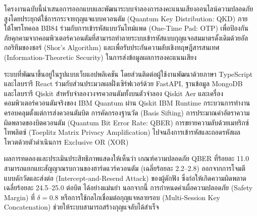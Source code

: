 \maketitle
\makesignature

\ifproject
\begin{abstractTH}
โครงงานฉบับนี้นำเสนอการออกแบบและพัฒนาระบบจำลองการลงคะแนนเสียงออนไลน์ความปลอดภัยสูงโดยประยุกต์ใช้การกระจายกุญแจแบบควอนตัม (Quantum Key Distribution: QKD) ภายใต้โพรโทคอล BB84 ร่วมกับการเข้ารหัสแบบวันไทม์แพด (One-Time Pad: OTP) เพื่อป้องกันภัยคุกคามจากคอมพิวเตอร์ควอนตัมที่สามารถทำลายระบบเข้ารหัสแบบกุญแจอสมมาตรดั้งเดิมด้วยอัลกอริทึมของชอร์ (Shor's Algorithm) และเพื่อรับประกันความลับเชิงทฤษฎีสารสนเทศ (Information-Theoretic Security) ในการส่งข้อมูลผลการลงคะแนนเสียง

\enskip ระบบที่พัฒนาขึ้นอยู่ในรูปแบบเว็บแอปพลิเคชัน โดยส่วนติดต่อผู้ใช้งานพัฒนาด้วยภาษา TypeScript และไลบรารี React ร่วมกับส่วนประมวลผลฝั่งเซิร์ฟเวอร์ด้วย FastAPI, ฐานข้อมูล MongoDB และไลบรารี Qiskit สำหรับจำลองวงจรควอนตัมทั้งบนตัวจำลอง Qiskit Aer และเครื่องคอมพิวเตอร์ควอนตัมจริงของ IBM Quantum ผ่าน Qiskit IBM Runtime กระบวนการทำงานครอบคลุมตั้งแต่การส่งควอนตัมบิต การคัดกรองฐานวัด (Basis Sifting) การประมาณค่าอัตราความผิดพลาดของบิตควอนตัม (Quantum Bit Error Rate: QBER) การขยายความลับด้วยเมทริกซ์โทพลิตซ์ (Toeplitz Matrix Privacy Amplification) ไปจนถึงการเข้ารหัสและถอดรหัสผลโหวตด้วยตัวดำเนินการ Exclusive OR (XOR)

\enskip ผลการทดลองและประเมินประสิทธิภาพแสดงให้เห็นว่า เกณฑ์ความปลอดภัย QBER ที่ร้อยละ 11.0 สามารถแยกแยะสัญญาณรบกวนของฮาร์ดแวร์ควอนตัม (เฉลี่ยร้อยละ 2.2--2.8) ออกจากการโจมตีแบบดักวัดและส่งต่อ (Intercept-and-Resend Attack) ของผู้ดักฟัง ซึ่งก่อให้เกิดความผิดพลาดเฉลี่ยร้อยละ 24.5--25.0 ต่อบิต ได้อย่างแม่นยำ นอกจากนี้ การกำหนดค่าเผื่อความปลอดภัย (Safety Margin) ที่ $\delta = 0.8$ หรือการใช้กลไกเชื่อมต่อกุญแจหลายรอบ (Multi-Session Key Concatenation) ช่วยให้ระบบสามารถสร้างกุญแจลับได้สำเร็จ
\end{abstractTH}

